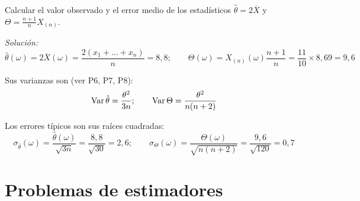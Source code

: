 \begin{enumerate}
  Calcular el valor observado y el error medio de los estadísticos $\hat{\theta} = 2\overline{X}$ y $\Theta = \frac{n+1}{n}X_{(n)}$.

  \smallskip
  \noindent\textit{Solución:}
  \[
    \hat{\theta}(\omega) = 2\overline{X}(\omega) = \frac{2(x_1 + \dots + x_n)}{n} = 8{,}8; \qquad \Theta(\omega) = X_{(n)}(\omega)\frac{n+1}{n} = \frac{11}{10}\times 8{,}69 = 9{,}6
  \]
 
  Sus varianzas son (ver P6, P7, P8):
  \[
    \operatorname{Var}\hat{\theta} = \frac{\theta^2}{3n}; \qquad \operatorname{Var}\Theta = \frac{\theta^2}{n(n+2)}
  \]
 
  Los errores típicos son sus raíces cuadradas:
  \[
    \sigma_{\hat{\theta}}(\omega) = \frac{\hat{\theta}(\omega)}{\sqrt{3n}} = \frac{8{,}8}{\sqrt{30}} = 2{,}6; \qquad \sigma_{\Theta}(\omega) = \frac{\Theta(\omega)}{\sqrt{n(n+2)}} = \frac{9{,}6}{\sqrt{120}} = 0{,}7
  \]
 
\end{enumerate}

\section{Problemas de estimadores}

